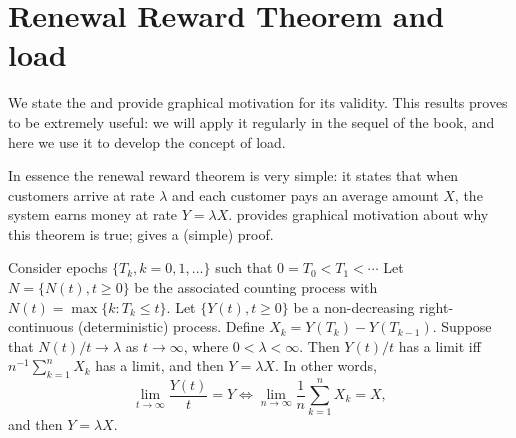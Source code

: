\section{Renewal Reward Theorem and load}
\label{sec:renew-reward-theor}



We state the  and provide graphical motivation for its validity.
This results proves to be extremely useful: we will apply it regularly in the sequel of the book, and here we use it to develop the concept of load.


In essence the renewal reward theorem is very simple: it states that when customers arrive at rate $\lambda$ and each customer pays an average amount $X$, the system earns money at rate $Y=\lambda X$.
 provides graphical motivation about why this theorem is true; \citet{el-taha98:_sampl_path_analy_queuein_system} gives a (simple) proof.

\begin{theorem}[Renewal Reward Theorem, $Y=\lambda X$]
 Consider epochs $\{T_k, k=0, 1, \ldots\}$ such that $0=T_0 < T_1 < \cdots$
 Let $N=\{N(t), t\geq 0\}$ be the associated counting process with $N(t) = \max\{k : T_k \leq t\}$.
 Let $\{Y(t), t\geq 0\}$ be a non-decreasing right-continuous (deterministic) process.
 Define $X_k = Y(T_k)-Y(T_{k-1})$.
 Suppose that $N(t)/t\to\lambda$ as $t\to\infty$, where $0<\lambda < \infty$.
 Then $Y(t)/t$ has a limit iff $n^{-1}\sum_{k=1}^n X_k$ has a limit, and then $Y=\lambda X$. In other words, 
 \begin{equation*}
 \lim_{t \to \infty} \frac{Y(t)}t=Y \iff \lim_{n \to \infty} \frac 1n\sum_{k=1}^n X_k = X, 
 \end{equation*}
and then $Y=\lambda X$. 
\end{theorem}


